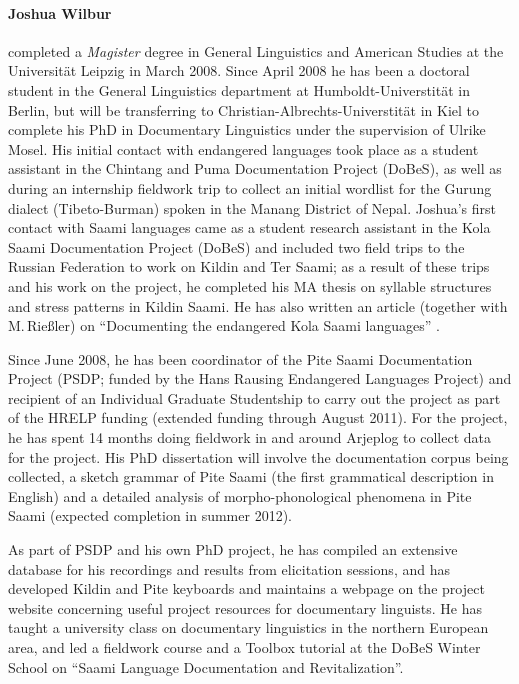 \documentclass[a4paper,12pt]{article}
\begin{document}
\paragraph{Joshua Wilbur} completed a \textit{Magister} degree in General Linguistics and American Studies at the Universität Leipzig in March 2008. Since April 2008 he has been a doctoral student in the General Linguistics department at Humboldt-Universtität in Berlin, but will be transferring to Christian-Albrechts-Universtität in Kiel to complete his PhD in Documentary Linguistics under the supervision of Ulrike Mosel. His initial contact with endangered languages took place as a student assistant in the Chintang and Puma Documentation Project (DoBeS), as well as during an internship fieldwork trip to collect an initial wordlist for the Gurung dialect (Tibeto-Burman) spoken in the Manang District of Nepal. Joshua's first contact with Saami languages came as a student research assistant in the Kola Saami Documentation Project (DoBeS) and included two field trips to the Russian Federation to work on Kildin and Ter Saami; as a result of these trips and his work on the project, he completed his MA thesis on syllable structures and stress patterns in Kildin Saami. He has also written an article (together with M.\,Rießler) on “Documenting the endangered {K}ola {S}aami languages” \citep{riesler-etal2007}.

Since June 2008, he has been coordinator of the Pite Saami Documentation Project (PSDP; funded by the Hans Rausing Endangered Languages Project) and recipient of an Individual Graduate Studentship to carry out the project as part of the HRELP funding (extended funding through August 2011). For the project, he has spent 14 months doing fieldwork in and around Arjeplog to collect data for the project. His PhD dissertation will involve the documentation corpus being collected, a sketch grammar of Pite Saami (the first grammatical description in English) and a detailed analysis of morpho-phonological phenomena in Pite Saami (expected completion in summer 2012).

As part of PSDP and his own PhD project, he has compiled an extensive database for his recordings and results from elicitation sessions, and has developed Kildin and Pite keyboards and maintains a webpage on the project website concerning useful project resources for documentary linguists. He has taught a university class on documentary linguistics in the northern European area, and led a fieldwork course and a Toolbox tutorial at the DoBeS Winter School on “Saami Language Documentation and Revitalization”.
\end{document}
